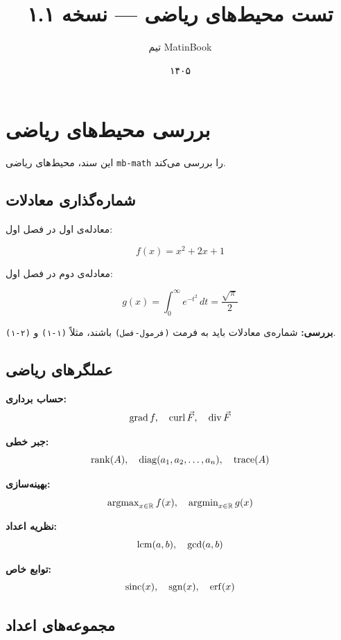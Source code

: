 \documentclass{matinbook}
\title{تست محیط‌های ریاضی — نسخه ۱.۱}
\author{تیم MatinBook}
\date{۱۴۰۵}
\begin{document}
\maketitle

\chapter{بررسی محیط‌های ریاضی}
\label{chap:test-math}

این سند، محیط‌های ریاضی \texttt{mb-math} را بررسی می‌کند.

\section{شماره‌گذاری معادلات}
\label{sec:equation-numbering}

معادله‌ی اول در فصل اول:

\begin{equation}
    \label{eq:math-test-1}
    f(x) = x^2 + 2x + 1
\end{equation}

معادله‌ی دوم در فصل اول:

\begin{equation}
    \label{eq:math-test-2}
    g(x) = \int_{0}^{\infty} e^{-t^2} \, dt = \frac{\sqrt{\pi}}{2}
\end{equation}

\textbf{بررسی:} شماره‌ی معادلات باید به فرمت \texttt{(فرمول-فصل)} باشند، مثلاً \texttt{(۱-۱)} و \texttt{(۲-۱)}.

\section{عملگرهای ریاضی}
\label{sec:operators}

\textbf{حساب برداری:}
\[
    \operatorname{grad} f, \quad \operatorname{curl} \vec{F}, \quad \operatorname{div} \vec{F}
\]

\textbf{جبر خطی:}
\[
    \operatorname{rank}(A), \quad \operatorname{diag}(a_1, a_2, \ldots, a_n), \quad \operatorname{trace}(A)
\]

\textbf{بهینه‌سازی:}
\[
    \operatorname{argmax}_{x \in \mathbb{R}} f(x), \quad \operatorname{argmin}_{x \in \mathbb{R}} g(x)
\]

\textbf{نظریه اعداد:}
\[
    \operatorname{lcm}(a, b), \quad \operatorname{gcd}(a, b)
\]

\textbf{توابع خاص:}
\[
    \operatorname{sinc}(x), \quad \operatorname{sgn}(x), \quad \operatorname{erf}(x)
\]

\section{مجموعه‌های اعداد}
\label{sec:number-sets}
\end{document}
